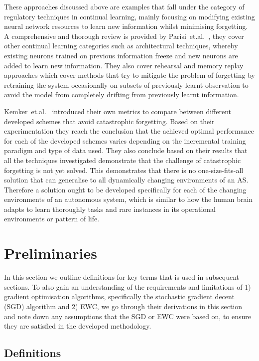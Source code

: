 These approaches discussed above are examples that fall under the category of regulatory techniques in continual learning, mainly focusing on modifying existing neural network resources to learn new information whilst minimising forgetting.
%
A comprehensive and thorough review is provided by Parisi~et.al.~\cite{Parisi2019}, they cover other continual learning categories such as architectural techniques, whereby existing neurons trained on previous information freeze and new neurons are added to learn new information.
%
They also cover rehearsal and memory replay approaches which cover methods that try to mitigate the problem of forgetting by retraining the system occasionally on subsets of previously learnt observation to avoid the model from completely drifting from previously learnt information. 

Kemker~et.al.~\cite{Kemker2018a} introduced their own metrics to compare between different developed schemes that avoid catastrophic forgetting.
%
Based on their experimentation they reach the conclusion that the achieved optimal performance for each of the developed schemes varies depending on the incremental training paradigm and type of data used. 
%
They also conclude based on their results that all the techniques investigated demonstrate that the challenge of catastrophic forgetting is not yet solved.
%
This demonstrates that there is no one-size-fits-all solution that can generalise to all dynamically changing environments of an AS.  
%
Therefore a solution ought to be developed specifically for each of the changing environments of an autonomous system, which is similar to how the human brain adapts to learn thoroughly tasks and rare instances in its operational environments or pattern of life. 


\section{Preliminaries}\label{sec:preliminaries}
In this section we outline definitions for key terms that is used in subsequent sections.
%
To also gain an understanding of the requirements and limitations of 1) gradient optimisation algorithms, specifically the stochastic gradient decent (SGD) algorithm and 2) EWC, we go through their derivations in this section and note down any assumptions that the SGD or EWC were based on, to ensure they are satisfied in the developed methodology. 

\subsection{Definitions} \label{definitions}
